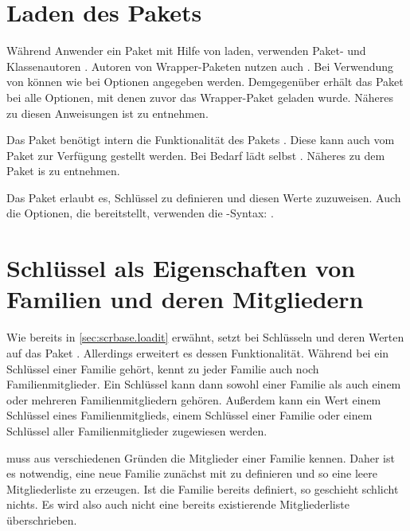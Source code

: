 \section{Laden des Pakets}

Während Anwender ein Paket mit Hilfe von  laden, verwenden
Paket- und Klassenautoren
. Autoren von Wrapper-Paketen
nutzen auch
. Bei
Verwendung von  können wie bei
 Optionen angegeben
werden. Demgegenüber erhält das Paket bei 
alle Optionen, mit denen zuvor das Wrapper-Paket geladen wurde. Näheres zu
diesen Anweisungen ist \cite{latex:clsguide} zu entnehmen.

Das Paket  benötigt intern die Funktionalität des Pakets
. Diese kann
auch vom Paket  zur Verfügung gestellt werden. Bei Bedarf
lädt  selbst . Näheres zu dem Paket is
\cite{package:keyval} zu entnehmen.

Das Paket  erlaubt es, Schlüssel zu definieren und diesen
Werte zuzuweisen.  Auch die Optionen, die  bereitstellt,
verwenden die -Syntax: %
.


\section{Schlüssel als Eigenschaften von Familien und deren Mitgliedern}

Wie bereits in \autoref{sec:scrbase.loadit} erwähnt, setzt 
bei Schlüsseln und deren Werten auf das Paket . Allerdings
erweitert es dessen Funktionalität. Während bei  ein Schlüssel
einer Familie gehört, kennt  zu jeder Familie auch noch
Familienmitglieder. Ein Schlüssel kann dann sowohl einer Familie als auch
einem oder mehreren Familienmitgliedern gehören. Außerdem kann ein Wert einem
Schlüssel eines Familienmitglieds, einem Schlüssel einer Familie oder einem
Schlüssel aller Familienmitglieder zugewiesen werden.

\begin{Declaration}
\end{Declaration}
 muss aus verschiedenen Gründen die Mitglieder einer Familie
kennen. Daher ist es notwendig, eine neue Familie zunächst mit
 zu definieren und so eine leere Mitgliederliste zu
erzeugen. Ist die Familie bereits definiert, so geschieht schlicht nichts. Es
wird also auch nicht eine bereits existierende Mitgliederliste überschrieben.

